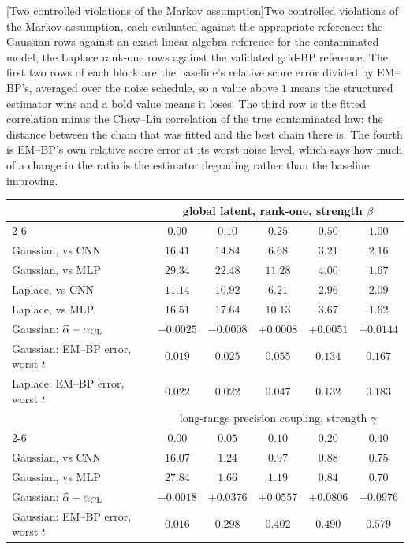 \begin{center}
\begin{minipage}{\linewidth}\small\centering
{}[Two controlled violations of the Markov assumption]{Two controlled violations of the Markov assumption, each
evaluated against the appropriate reference: the Gaussian rows against an exact linear-algebra reference for the contaminated model, the Laplace rank-one rows against the validated grid-BP reference. The first two rows of
each block are the baseline's relative score error divided by EM--BP's,
averaged over the noise schedule, so a value above $1$ means the structured
estimator wins and a bold value means it loses. The third row is the fitted
correlation minus the Chow--Liu correlation of the true contaminated law: the
distance between the chain that was fitted and the best chain there is. The
fourth is EM--BP's own relative score error at its worst noise level, which
says how much of a change in the ratio is the estimator degrading rather than
the baseline improving.}
\label{tab:nonmarkov}
\begin{tabular}{@{}lccccc@{}}
\toprule
& \multicolumn{5}{c}{global latent, rank-one, strength $\beta$} \\
\cmidrule(lr){2-6}
& $0.00$ & $0.10$ & $0.25$ & $0.50$ & $1.00$ \\
\midrule
Gaussian, vs CNN & $16.41$ & $14.84$ & $6.68$ & $3.21$ & $2.16$ \\
Gaussian, vs MLP & $29.34$ & $22.48$ & $11.28$ & $4.00$ & $1.67$ \\
Laplace, vs CNN & $11.14$ & $10.92$ & $6.21$ & $2.96$ & $2.09$ \\
Laplace, vs MLP & $16.51$ & $17.64$ & $10.13$ & $3.67$ & $1.62$ \\
Gaussian: $\widehat{\alpha} - \alpha_{\mathrm{CL}}$ & $-0.0025$ & $-0.0008$ & $+0.0008$ & $+0.0051$ & $+0.0144$ \\
Gaussian: EM--BP error, worst $t$ & $0.019$ & $0.025$ & $0.055$ & $0.134$ & $0.167$ \\
Laplace: EM--BP error, worst $t$ & $0.022$ & $0.022$ & $0.047$ & $0.132$ & $0.183$ \\
\midrule
& \multicolumn{5}{c}{long-range precision coupling, strength $\gamma$} \\
\cmidrule(lr){2-6}
& $0.00$ & $0.05$ & $0.10$ & $0.20$ & $0.40$ \\
\midrule
Gaussian, vs CNN & $16.07$ & $1.24$ & $\mathbf{0.97}$ & $\mathbf{0.88}$ & $\mathbf{0.75}$ \\
Gaussian, vs MLP & $27.84$ & $1.66$ & $1.19$ & $\mathbf{0.84}$ & $\mathbf{0.70}$ \\
Gaussian: $\widehat{\alpha} - \alpha_{\mathrm{CL}}$ & $+0.0018$ & $+0.0376$ & $+0.0557$ & $+0.0806$ & $+0.0976$ \\
Gaussian: EM--BP error, worst $t$ & $0.016$ & $0.298$ & $0.402$ & $0.490$ & $0.579$ \\
\bottomrule
\end{tabular}
\end{minipage}
\end{center}
